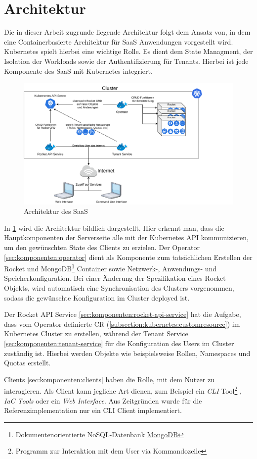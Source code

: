 \section{Architektur}
\label{sec:komponenten:architektur}

Die in dieser Arbeit zugrunde liegende Architektur folgt dem Ansatz von\cite{Truyen2016}, in dem eine Containerbasierte
Architektur für \ac{SaaS} Anwendungen vorgestellt wird. Kubernetes spielt hierbei eine wichtige Rolle. Es dient dem State
Managment, der Isolation der Workloads sowie der Authentifizierung für Tenants. Hierbei ist jede Komponente des \ac{SaaS}
mit Kubernetes integriert.

\begin{figure}[h]
  \includegraphics[width=45em]{gfx/chapters/3_komponenten/saas_architecture.pdf}
  \caption{Architektur des \ac{SaaS}}
  \label{fig:architektur}
\end{figure}

In \ref{fig:architektur} wird die Architektur bildlich dargestellt.
Hier erkennt man, dass die Hauptkomponenten der Serverseite alle mit der Kubernetes API kommunizieren,
um den gewünschten State des Clients zu erzielen. Der Operator \ref{sec:komponenten:operator} dient als Komponente zum tatsächlichen
Erstellen der Rocket und MongoDB\footnote{Dokumentenorientierte NoSQL-Datenbank \href{https://www.mongodb.com/}{MongoDB}}
Container sowie Netzwerk-, Anwendungs- und Speicherkonfiguration.
Bei einer Änderung der Spezifikation eines Rocket Objekts, wird automatisch eine Synchronisation des 
Clusters vorgenommen, sodass die gewünschte Konfiguration im Cluster deployed ist.

Der Rocket API Service \ref{sec:komponenten:rocket-api-service} hat die Aufgabe, 
dass vom Operator definierte \ac{CR} (\ref{subsection:kubernetes:customresource}) im Kubernetes Cluster zu erstellen,
während der Tenant Service \ref{sec:komponenten:tenant-service} für die Konfiguration des Users im Cluster zuständig ist.
Hierbei werden Objekte wie beispielsweise Rollen, Namespaces und Quotas erstellt.

Clients \ref{sec:komponenten:clients} haben die Rolle, mit dem Nutzer zu interagieren. 
Als Client kann jegliche Art dienen, zum Beispiel ein \emph{\ac{CLI}} Tool\footnote{Programm zur Interaktion mit dem User via Kommandozeile}
, \emph{\ac{IaC} Tools} oder ein \emph{Web Interface}. Aus Zeitgründen wurde für die Referenzimplementation nur
ein \ac{CLI} Client implementiert.
